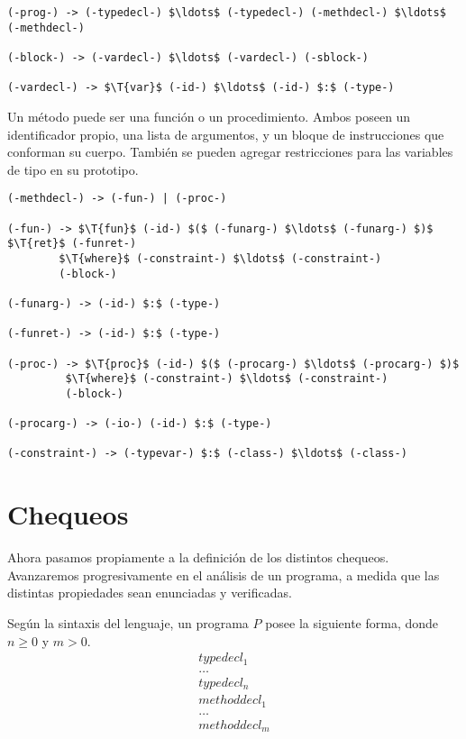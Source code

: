 \documentclass{article}
\begin{document}

\begin{lstlisting}[style = syntax]
(-prog-) -> (-typedecl-) $\ldots$ (-typedecl-) (-methdecl-) $\ldots$ (-methdecl-)

(-block-) -> (-vardecl-) $\ldots$ (-vardecl-) (-sblock-)

(-vardecl-) -> $\T{var}$ (-id-) $\ldots$ (-id-) $:$ (-type-)
\end{lstlisting}

Un método puede ser una función o un procedimiento.
Ambos poseen un identificador propio, una lista de argumentos, y un bloque de instrucciones que conforman su cuerpo.
También se pueden agregar restricciones para las variables de tipo en su prototipo.

\begin{lstlisting}[style = syntax]
(-methdecl-) -> (-fun-) | (-proc-)

(-fun-) -> $\T{fun}$ (-id-) $($ (-funarg-) $\ldots$ (-funarg-) $)$ $\T{ret}$ (-funret-)
        $\T{where}$ (-constraint-) $\ldots$ (-constraint-)
        (-block-)

(-funarg-) -> (-id-) $:$ (-type-)

(-funret-) -> (-id-) $:$ (-type-)

(-proc-) -> $\T{proc}$ (-id-) $($ (-procarg-) $\ldots$ (-procarg-) $)$
         $\T{where}$ (-constraint-) $\ldots$ (-constraint-)
         (-block-)

(-procarg-) -> (-io-) (-id-) $:$ (-type-)

(-constraint-) -> (-typevar-) $:$ (-class-) $\ldots$ (-class-)
\end{lstlisting}

\section{Chequeos}

Ahora pasamos propiamente a la definición de los distintos chequeos.
Avanzaremos progresivamente en el análisis de un programa, a medida que las distintas propiedades sean enunciadas y verificadas.

Según la sintaxis del lenguaje, un programa $P$ posee la siguiente forma, donde $n \geq 0$ y $m > 0$.
\begin{gather*}
typedecl_1 \\
\ldots \\
typedecl_n \\
methoddecl_1 \\
\ldots \\
methoddecl_m
\end{gather*}
\end{document}
